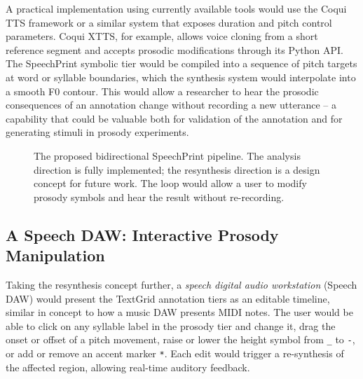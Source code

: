 A practical implementation using currently available tools would use the
Coqui TTS framework or a similar system that exposes duration and pitch control
parameters. Coqui XTTS, for example, allows voice cloning from a short reference
segment and accepts prosodic modifications through its Python API. The SpeechPrint
symbolic tier would be compiled into a sequence of pitch targets at word or
syllable boundaries, which the synthesis system would interpolate into a smooth
F0 contour. This would allow a researcher to hear the prosodic consequences of an
annotation change without recording a new utterance -- a capability that could be
valuable both for validation of the annotation and for generating stimuli in
prosody experiments.

\begin{figure}[htbp]
\centering
{}
\caption{The proposed bidirectional SpeechPrint pipeline. The analysis direction
is fully implemented; the resynthesis direction is a design concept for future
work. The loop would allow a user to modify prosody symbols and hear the result
without re-recording.}
\label{fig:resynthesis_pipeline}
\end{figure}

\subsection{A Speech DAW: Interactive Prosody Manipulation}
\label{sec:speech_daw}

Taking the resynthesis concept further, a \emph{speech digital audio workstation}
(Speech DAW) would present the TextGrid annotation tiers as an editable timeline,
similar in concept to how a music DAW presents MIDI notes. The user would be able
to click on any syllable label in the prosody tier and change it, drag the onset
or offset of a pitch movement, raise or lower the height symbol from \texttt{\_}
to \texttt{-}, or add or remove an accent marker \texttt{*}. Each edit would
trigger a re-synthesis of the affected region, allowing real-time auditory
feedback.

